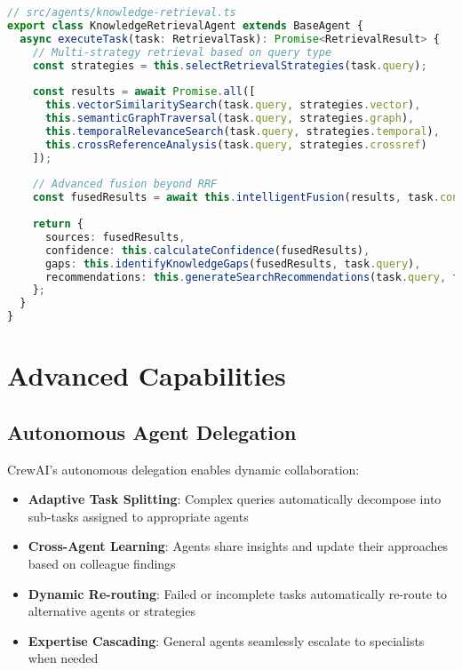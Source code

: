\documentclass[11pt, a4paper]{article}
\begin{document}
\begin{lstlisting}[language=TypeScript, caption=Agent-Specific Retrieval Enhancement]
// src/agents/knowledge-retrieval.ts
export class KnowledgeRetrievalAgent extends BaseAgent {
  async executeTask(task: RetrievalTask): Promise<RetrievalResult> {
    // Multi-strategy retrieval based on query type
    const strategies = this.selectRetrievalStrategies(task.query);
    
    const results = await Promise.all([
      this.vectorSimilaritySearch(task.query, strategies.vector),
      this.semanticGraphTraversal(task.query, strategies.graph),
      this.temporalRelevanceSearch(task.query, strategies.temporal),
      this.crossReferenceAnalysis(task.query, strategies.crossref)
    ]);
    
    // Advanced fusion beyond RRF
    const fusedResults = await this.intelligentFusion(results, task.context);
    
    return {
      sources: fusedResults,
      confidence: this.calculateConfidence(fusedResults),
      gaps: this.identifyKnowledgeGaps(fusedResults, task.query),
      recommendations: this.generateSearchRecommendations(task.query, fusedResults)
    };
  }
}
\end{lstlisting}

\section{Advanced Capabilities}

\subsection{Autonomous Agent Delegation}

CrewAI's autonomous delegation enables dynamic collaboration:

\begin{itemize}
    \item \textbf{Adaptive Task Splitting}: Complex queries automatically decompose into sub-tasks assigned to appropriate agents
    \item \textbf{Cross-Agent Learning}: Agents share insights and update their approaches based on colleague findings
    \item \textbf{Dynamic Re-routing}: Failed or incomplete tasks automatically re-route to alternative agents or strategies
    \item \textbf{Expertise Cascading}: General agents seamlessly escalate to specialists when needed
\end{itemize}
\end{document}
